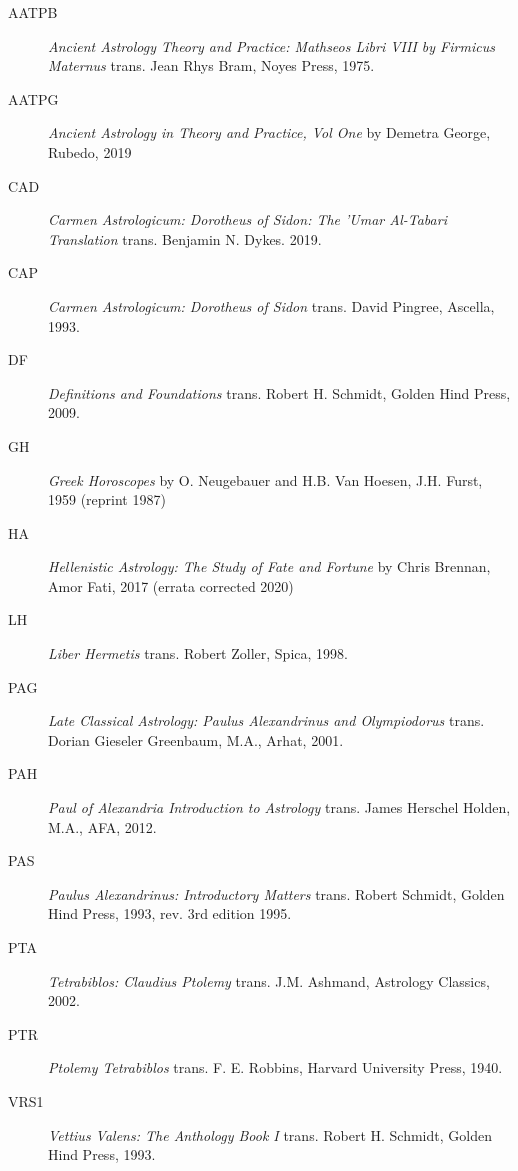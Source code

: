 \begin{description}
\item[AATPB]
	\textsl{Ancient Astrology Theory and Practice: Mathseos Libri VIII by Firmicus Maternus} trans. Jean Rhys Bram, Noyes Press, 1975.	
	
\item[AATPG] \textsl{Ancient Astrology in Theory and Practice, Vol One} by Demetra George, Rubedo, 2019

\item[CAD]
	\textsl{Carmen Astrologicum: Dorotheus of Sidon: The 'Umar Al-Tabari Translation} trans. Benjamin N. Dykes. 2019.

\item[CAP]
	\textsl{Carmen Astrologicum: Dorotheus of Sidon} trans. David Pingree, Ascella, 1993.

\item[DF]
	\textsl{Definitions and Foundations} trans. Robert H. Schmidt, Golden Hind Press, 2009.
	
\item[GH] 
	\textsl{Greek Horoscopes} by O. Neugebauer and H.B. Van Hoesen, J.H. Furst, 1959 (reprint 1987)
	
\item[HA] 
	\textsl{Hellenistic Astrology: The Study of Fate and Fortune} by Chris Brennan, Amor Fati, 2017 (errata corrected 2020)
	
\item[LH]
	\textsl{Liber Hermetis} trans. Robert Zoller, Spica, 1998.
	
\item[PAG] 
	\textsl{Late Classical Astrology: Paulus Alexandrinus and Olympiodorus} trans. Dorian Gieseler Greenbaum, M.A., Arhat, 2001.

\item[PAH] 
	\textsl{Paul of Alexandria Introduction to Astrology} trans. James Herschel Holden, M.A., AFA, 2012.

\item[PAS] 
	\textsl{Paulus Alexandrinus: Introductory Matters} trans. Robert Schmidt, Golden Hind Press, 1993, rev. 3rd edition 1995.
	
\item[PTA]
	\textsl{Tetrabiblos: Claudius Ptolemy} trans. J.M. Ashmand, Astrology Classics, 2002.
	
\item[PTR]
	\textit{Ptolemy Tetrabiblos} trans.  F. E. Robbins, Harvard University Press, 1940.
	
\item[VRS1] 
	\textsl{Vettius Valens: The Anthology Book I} trans. Robert H. Schmidt, Golden Hind Press, 1993.


\end{description}
